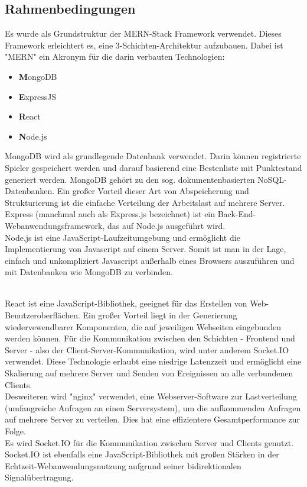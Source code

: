 \documentclass[conference]{IEEEtran}
\begin{document}
\begin{itemize}


\subsection{Rahmenbedingungen}

Es wurde als Grundstruktur der MERN-Stack Framework verwendet.
Dieses Framework erleichtert es, eine 3-Schichten-Architektur aufzubauen. Dabei ist "MERN" ein Akronym für die darin verbauten Technologien:
\\
\begin{itemize}
    \item \textbf {M}ongoDB
    \item \textbf {E}xpressJS
    \item \textbf {R}eact
    \item \textbf {N}ode.js
\end{itemize}

MongoDB wird als grundlegende Datenbank verwendet. Darin können registrierte Spieler gespeichert werden und darauf basierend eine Bestenliste mit Punktestand generiert werden.
MongoDB gehört zu den sog. dokumentenbasierten NoSQL-Datenbanken. Ein großer Vorteil dieser Art von Abspeicherung und Strukturierung ist die einfache Verteilung der Arbeitslast auf mehrere Server.
\\
Express (manchmal auch als Express.js bezeichnet) ist ein Back-End-Webanwendungsframework, das auf Node.js ausgeführt wird.
\\
Node.js ist eine JavaScript-Laufzeitumgebung und ermöglicht die Implementierung von Javascript auf einem Server. Somit ist man in der Lage, einfach und unkompliziert Javascript außerhalb eines Browsers auszuführen und mit Datenbanken wie MongoDB zu verbinden.

\\
React ist eine JavaScript-Bibliothek, geeignet für das Erstellen von Web-Benutzeroberflächen. Ein großer Vorteil liegt in der Generierung wiedervewendbarer Komponenten, die auf jeweiligen Webseiten eingebunden werden können.
Für die Kommunikation zwischen den Schichten - Frontend und Server - also der Client-Server-Kommunikation, wird unter anderem Socket.IO verwendet. Diese Technologie erlaubt eine niedrige Latenzzeit und ermöglicht eine Skalierung auf mehrere Server und Senden von Ereignissen an alle verbundenen Clients.
\\
Desweiteren wird "nginx" verwendet, eine Webserver-Software zur Lastverteilung (umfangreiche Anfragen an einen Serversystem), um die aufkommenden Anfragen  auf mehrere Server zu verteilen. Dies hat eine effizientere Gesamtperformance zur Folge.
\\
Es wird Socket.IO für die Kommunikation zwischen Server und Clients genutzt. Socket.IO ist ebenfalls eine JavaScript-Bibliothek mit großen Stärken in der Echtzeit-Webanwendungsnutzung aufgrund seiner bidirektionalen Signalübertragung.


\end{itemize}
\end{document}
